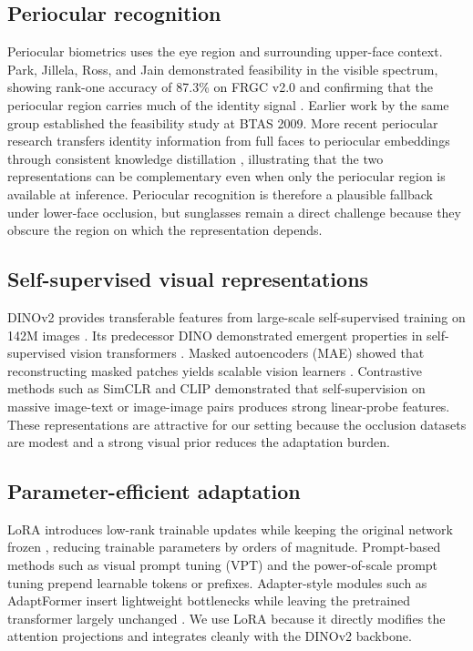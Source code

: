 \documentclass[10pt,journal,compsoc]{IEEEtran}
\begin{document}
\subsection{Periocular recognition}
Periocular biometrics uses the eye region and surrounding upper-face context. Park, Jillela, Ross, and Jain demonstrated feasibility in the visible spectrum, showing rank-one accuracy of 87.3\% on FRGC v2.0 and confirming that the periocular region carries much of the identity signal \cite{periocular}. Earlier work by the same group established the feasibility study at BTAS 2009. More recent periocular research transfers identity information from full faces to periocular embeddings through consistent knowledge distillation \cite{ckd2024}, illustrating that the two representations can be complementary even when only the periocular region is available at inference. Periocular recognition is therefore a plausible fallback under lower-face occlusion, but sunglasses remain a direct challenge because they obscure the region on which the representation depends.

\subsection{Self-supervised visual representations}
DINOv2 provides transferable features from large-scale self-supervised training on 142M images \cite{dinov2}. Its predecessor DINO demonstrated emergent properties in self-supervised vision transformers \cite{dino}. Masked autoencoders (MAE) showed that reconstructing masked patches yields scalable vision learners \cite{mae}. Contrastive methods such as SimCLR \cite{simclr} and CLIP \cite{clip} demonstrated that self-supervision on massive image-text or image-image pairs produces strong linear-probe features. These representations are attractive for our setting because the occlusion datasets are modest and a strong visual prior reduces the adaptation burden.

\subsection{Parameter-efficient adaptation}
LoRA introduces low-rank trainable updates while keeping the original network frozen \cite{lora}, reducing trainable parameters by orders of magnitude. Prompt-based methods such as visual prompt tuning (VPT) \cite{vpt} and the power-of-scale prompt tuning \cite{prompt} prepend learnable tokens or prefixes. Adapter-style modules such as AdaptFormer insert lightweight bottlenecks while leaving the pretrained transformer largely unchanged \cite{adaptformer}. We use LoRA because it directly modifies the attention projections and integrates cleanly with the DINOv2 backbone.
\end{document}
